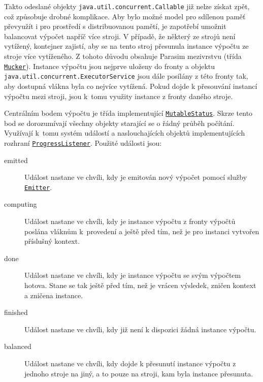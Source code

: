 Takto odeslané objekty \texttt{java.util.concurrent.Callable} již nelze získat zpět,
což způsobuje drobné komplikace. Aby bylo možné model pro sdílenou paměť převyužít i pro prostředí s distribuovanou pamětí,
je zapotřebí u\-mož\-nit balancovat výpočet napříč více stroji. V případě, že některý ze strojů není vytížený, kontejner zajistí,
aby se na tento stroj přesunula instance výpočtu ze stroje více vytíženého. Z tohoto důvodu
obsahuje Parasim mezivrstvu (třída \href{https://github.com/sybila/parasim/blob/2.0.0.Final/extensions/computation-lifecycle-impl/src/main/java/org/sybila/parasim/computation/lifecycle/impl/common/Mucker.java}{\texttt{Mucker}}). Instance výpočtu jsou nejprve uloženy do fronty a objektu \texttt{java.util.concurrent.ExecutorService}
jsou dále posílány z této fronty tak, aby dostupná vlákna byla co nejvíce vytížená.
Pokud dojde k přesouvání instancí výpočtu mezi stroji, jsou k~tomu využity instance z fronty daného stroje.

Centrálním bodem výpočtu je třída implementující \href{https://github.com/sybila/parasim/blob/2.0.0.Final/extensions/computation-lifecycle-api/src/main/java/org/sybila/parasim/computation/lifecycle/api/MutableStatus.java}{\texttt{MutableStatus}}. Skrze tento bod se dorozumívají všechny objekty
starající se o řádný průběh počítání. Využívají k~tomu systém událostí a naslouchajících objektů
implementujících rozhraní \href{https://github.com/sybila/parasim/blob/2.0.0.Final/extensions/computation-lifecycle-api/src/main/java/org/sybila/parasim/computation/lifecycle/api/ProgressListener.java}{\texttt{ProgressListener}}. Použité události jsou:

\begin{description}

    \item[emitted] 		Událost nastane ve chvíli, kdy je emitován nový výpočet pomocí služby
						\href{https://github.com/sybila/parasim/blob/2.0.0.Final/extensions/computation-lifecycle-api/src/main/java/org/sybila/parasim/computation/lifecycle/api/Emitter.java}{\texttt{Emitter}}.

    \item[computing] 	Událost nastane ve chvíli, kdy je instance výpočtu z fronty vý\-poč\-tů poslána
						vláknům k~provedení a ještě před tím, než je pro instanci vytvořen příslušný kontext.

    \item[done] 		Událost nastane ve chvíli, kdy je instance výpočtu se svým výpočtem
						hotova. Stane se tak ještě před tím, než je vrácen výsledek,
						zničen kontext a zničena instance.

	\item[finished]		Událost nastane ve chvíli, kdy již není k dispozici žádná instance výpočtu.
	
	\item[balanced]		Událost nastane ve chvíli, kdy dojde k přesunutí instance vý\-poč\-tu z jednoho stroje na jiný,
						a to pouze na stroji, kam byla instance pře\-su\-nu\-ta.
\end{description}

